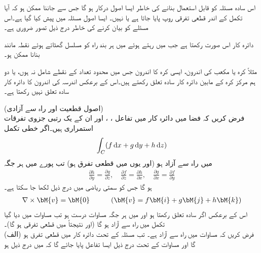 اس سادہ مسئلہ کو قابل استعمال بنانے کی خاطر  ایسا اصول درکار ہو گا جس سے جاننا ممکن ہو کہ آیا تکمل کے اندر قطعی تفرقی روپ پایا جاتا ہے یا نہیں۔ ایسا اصول  مسئلہ  میں پیش کیا گیا ہے۔اس مسئلے کو بیان کرنے کی خاطر درج ذیل تصور ضروری ہے۔

دائرہ کار  اس صورت  رکھتا ہے جب  میں رہتے ہوئے   میں ہر بند راہ کو  مسلسل گھٹاتے ہوئے نقطہ مانند بنانا ممکن ہو۔ 

مثلاً کرہ یا مکعب کی اندرون، ایسی کرہ کا اندرون جس میں محدود تعداد کے نقطے شامل نہ ہوں، یا دو ہم مرکز کرہ کے مابین دائرہ کار سادہ تعلق رکھتے ہیں۔اس کے برعکس  اندرسہ کی اندرون کا دائرہ کار سادہ تعلق نہیں رکھتا ہے۔   

 \quad (اصول قطعیت اور راہ سے آزادی)\\
فرض کریں کہ فضا میں دائرہ کار  میں تفاعل ، ،  اور ان کے یک رتبی جزوی تفرقات استمراری ہیں۔اگر خطی تکمل
\begin{align}\label{مساوات_خطی_تکمل_اصول_قطعیت_الف}
\int_C (f\dif x+g\dif y+h\dif z)
\end{align}
 میں راہ سے آزاد ہو (اور یوں  میں  قطعی تفرق ہو) تب پورے  میں ہر جگہ 
\begin{align}\label{مساوات_خطی_تکمل_اصول_قطعیت_ب}
\frac{\partial h}{\partial y}=\frac{\partial g}{\partial z}, \quad \frac{\partial f}{\partial z}=\frac{\partial h}{\partial x},\quad 
\frac{\partial g}{\partial x}=\frac{\partial f}{\partial y}
\end{align}
ہو گا جس کو سمتی ریاضی میں درج ذیل لکھا جا سکتا ہے۔
\begin{align}\label{مساوات_خطی_تکمل_اصول_قطعیت_پ}
\nabla \times \bM{v}=\bM{0}\quad \quad \quad (\bM{v}=f\bM{i}+g\bM{j}+h\bM{k})
\end{align}
اس کے برعکس اگر  سادہ تعلق رکھتا ہو اور   میں ہر جگہ مساوات  درست ہو تب مساوات  میں دیا گیا تکمل  میں راہ سے آزاد ہو گا (اور نتیجتاً  میں  قطعی تفرقی ہو گا)۔
\\
(الف) فرض کریں کہ مساوات   میں راہ سے آزاد ہے۔ تب مسئلہ  کے تحت 
 دائرہ کار  میں قطعی تفرق ہو گا اور مساوات  کے تحت درج ذیل  ایسا تفاعل  پایا جائے گا  کہ  میں درج ذیل ہو
